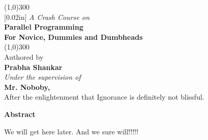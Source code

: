 \documentclass[12pt, a4paper]{report}
\begin{document}
\begin{titlepage}
    \begin{center}
    \line(1,0){300}\\
    [0.02in]
    \large{\emph {A Crash Course on}}\\	
    \Huge{\bfseries Parallel Programming}\\
    \large{\bfseries For Novice, Dummies and Dumbheads}\\
    [-0.12in]
    \line(1,0){300}\\
    
    \vspace{0.35in}
    \normalsize{Authored by}\\
    
    \LARGE{\bfseries {Prabha Shankar}}\\
    
    \vspace{1.5cm}
    \normalsize{\emph {Under the supervision of}}\\
    \large{\bfseries {Mr. Noboby,}}\\
    \small{After the enlightenment that Ignorance is definitely not blissful.}\\
    
\end{center}
\end{titlepage}



\begin{titlepage}
    \begin{center}
    \bfseries{Abstract}
    \end{center}
    \vspace{0.8cm}

    We will get here later. And we sure will!!!!! 

\end{titlepage}




\begin{titlepage}
\tableofcontents
\end{titlepage}
\listoffigures
\cleardoublepage
\end{document}
